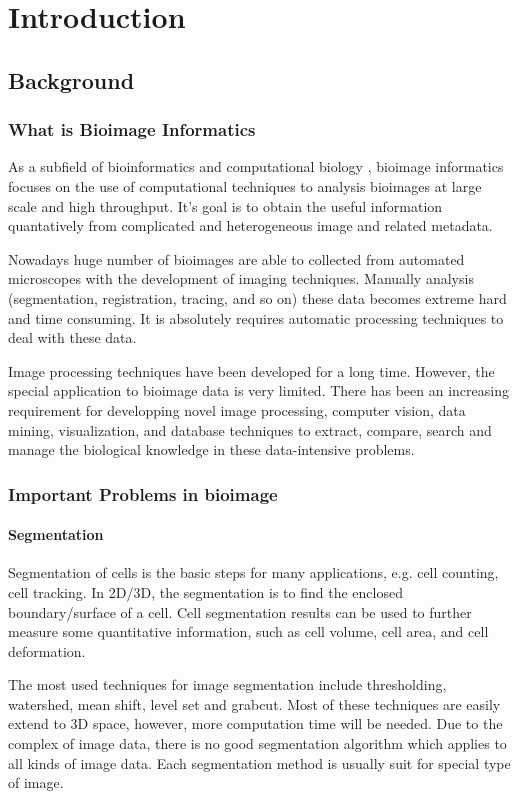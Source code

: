 \chapter{Introduction}
\section{Background}
\subsection{What is Bioimage Informatics}
As a subfield of bioinformatics and computational biology \cite{peng2012bioimage}, bioimage informatics focuses on the use of computational techniques to analysis bioimages at large scale and high throughput. It's goal is to obtain the useful information quantatively from complicated and heterogeneous image and related metadata.

Nowadays huge number of bioimages are able to collected from automated microscopes with the development of imaging techniques. Manually analysis (segmentation, registration, tracing, and so on) these data becomes extreme hard and time consuming. It is absolutely requires automatic processing techniques to deal with these data. 

Image processing techniques have been developed for a long time. However, the special application to bioimage data is very limited. There has been an increasing requirement for developping novel image processing, computer vision, data mining, visualization, and database techniques to extract, compare, search and manage the biological knowledge in these data-intensive problems.
\subsection{Important Problems in bioimage}
\subsubsection{Segmentation}
Segmentation of cells is the basic steps for many applications, e.g. cell counting, cell tracking. In 2D/3D, the segmentation is to find the enclosed boundary/surface of a cell. Cell segmentation results can be used to further measure some quantitative information, such as cell volume, cell area, and cell deformation. 

The most used techniques for image segmentation include thresholding, watershed, mean shift, level set and grabcut. Most of these techniques are easily extend to 3D space, however, more computation time will be needed. Due to the complex of image data, there is no good segmentation algorithm which applies to all kinds of image data. Each segmentation method is usually suit for special type of image.

